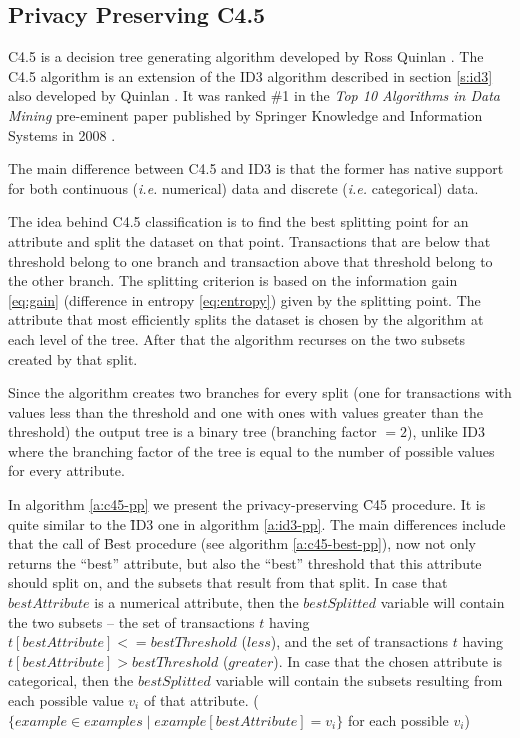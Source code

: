 \subsection{Privacy Preserving C4.5}\label{s:pp-c45}
C4.5 is a decision tree generating algorithm developed by Ross Quinlan \cite{quinlan1993c4}.
The C4.5 algorithm is an extension of the ID3 algorithm described in section \ref{s:id3} also developed by Quinlan \cite{quinlan1986induction}.
It was ranked \#1 in the \textit{Top 10 Algorithms in Data Mining} pre\hyp eminent paper published by Springer Knowledge and Information Systems in 2008 \cite{wu2008top}.

The main difference between C4.5 and ID3 is that the former has native support for both continuous (\textit{i.e.} numerical) data and discrete (\textit{i.e.} categorical) data.

The idea behind C4.5 classification is to find the best splitting point for an attribute and split the dataset on that point.
Transactions that are below that threshold belong to one branch and transaction above that threshold belong to the other branch.
The splitting criterion is based on the information gain \ref{eq:gain} (difference in entropy \ref{eq:entropy}) given by the splitting point.
The attribute that most efficiently splits the dataset is chosen by the algorithm at each level of the tree.
After that the algorithm recurses on the two subsets created by that split.

Since the algorithm creates two branches for every split (one for transactions with values less than the threshold and one with ones with values greater than the threshold) the output tree is a binary tree (branching factor $= 2$), unlike ID3 where the branching factor of the tree is equal to the number of possible values for every attribute.

In algorithm \ref{a:c45-pp} we present the privacy\hyp preserving \f{C45} procedure.
It is quite similar to the \f{ID3} one in algorithm \ref{a:id3-pp}.
The main differences include that the call of \f{Best} procedure (see algorithm \ref{a:c45-best-pp}), now not only returns the ``best'' attribute, but also the ``best'' threshold that this attribute should split on, and the subsets that result from that split.
In case that $bestAttribute$ is a numerical attribute, then the $bestSplitted$ variable will contain the two subsets -- the set of transactions $t$ having $t[bestAttribute] <= bestThreshold$ ($less$), and the set of transactions $t$ having $t[bestAttribute] > bestThreshold$ ($greater$).
In case that the chosen attribute is categorical, then the $bestSplitted$ variable will contain the subsets resulting from each possible value $v_i$ of that attribute. ($\{example \in examples \mid example[bestAttribute] = v_i\}$ for each possible $v_i$)

